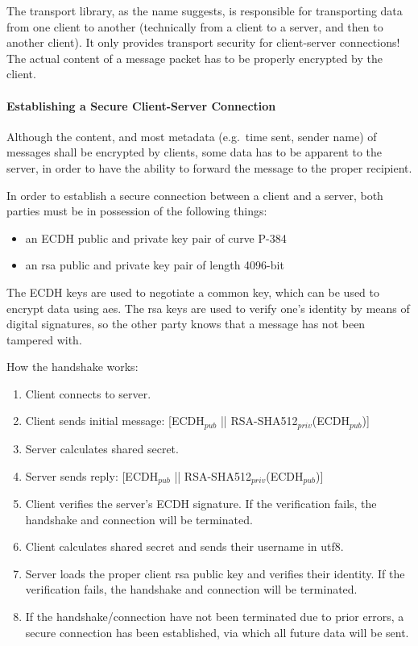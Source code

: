 The transport library, as the name suggests, is responsible for transporting data from one client to another
(technically from a client to a server, and then to another client).
It only provides transport security for client-server connections!
The actual content of a message packet has to be properly encrypted by the client.

\paragraph{Establishing a Secure Client-Server Connection}
Although the content, and most metadata (e.g.\ time sent, sender name) of messages shall be encrypted by clients, some
data has to be apparent to the server, in order to have the ability to forward the message to the proper recipient.

In order to establish a secure connection between a client and a server, both parties must be in possession of the
following things:

\begin{itemize}
  \setlength\itemsep{-.5em}
  \item an \ac{ECDH} public and private key pair of curve P-384~\cite{nist-digital-signature-standard}
  \item an \ac{rsa} public and private key pair of length 4096-bit
\end{itemize}

The \ac{ECDH} keys are used to negotiate a common key, which can be used to encrypt data using \ac{aes}.
The \ac{rsa} keys are used to verify one's identity by means of digital signatures, so the other party knows that a
message has not been tampered with.

How the handshake works:
\vspace{-.75em}
\begin{enumerate}
  \setlength\itemsep{-.5em}
  \item Client connects to server.
  \item Client sends initial message: [\ac{ECDH}$_{pub}$ || RSA-SHA512$_{priv}$(\ac{ECDH}$_{pub}$)]
  \item Server calculates shared secret.
  \item Server sends reply: [\ac{ECDH}$_{pub}$ || RSA-SHA512$_{priv}$(\ac{ECDH}$_{pub}$)]
  \item Client verifies the server's \ac{ECDH} signature.
    If the verification fails, the handshake and connection will be terminated.
  \item Client calculates shared secret and sends their username in \ac{utf8}.
  \item Server loads the proper client \ac{rsa} public key and verifies their identity.
    If the verification fails, the handshake and connection will be terminated.
  \item If the handshake/connection have not been terminated due to prior errors, a secure connection has been
    established, via which all future data will be sent.
\end{enumerate}

